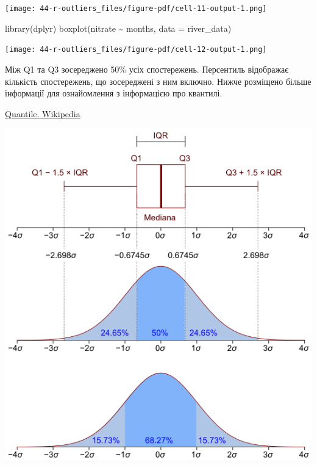 \documentclass[
  letterpaper,
  DIV=11,
  numbers=noendperiod]{scrreprt}
\newenvironment{Shaded}{\begin{snugshade}}{\end{snugshade}}
\newcommand{\AttributeTok}[1]{\textcolor[rgb]{0.40,0.45,0.13}{#1}}
\newcommand{\FunctionTok}[1]{\textcolor[rgb]{0.28,0.35,0.67}{#1}}
\newcommand{\NormalTok}[1]{\textcolor[rgb]{0.00,0.23,0.31}{#1}}
\newcommand{\SpecialCharTok}[1]{\textcolor[rgb]{0.37,0.37,0.37}{#1}}
\newcommand{\StringTok}[1]{\textcolor[rgb]{0.13,0.47,0.30}{#1}}
\begin{document}
\begin{Shaded}
\end{Shaded}

\texttt{[image: 44-r-outliers\_files/figure-pdf/cell-11-output-1.png]}

\begin{Shaded}
\begin{Highlighting}[]
\FunctionTok{library}\NormalTok{(dplyr)}
\FunctionTok{boxplot}\NormalTok{(nitrate }\SpecialCharTok{\textasciitilde{}}\NormalTok{ months, }\AttributeTok{data =}\NormalTok{ river\_data)}
\end{Highlighting}
\end{Shaded}

\texttt{[image: 44-r-outliers\_files/figure-pdf/cell-12-output-1.png]}

Між Q1 та Q3 зосереджено 50\% усіх спостережень. Персентиль відображає
кількість спостережень, що зосереджені з ним включно. Нижче розміщено
більше інформації для ознайомлення з інформацією про квантилі.

\href{https://en.wikipedia.org/wiki/Quantile}{Quantile. Wikipedia}

\includegraphics{img/da-data-cleaning/quantiles.png}
\end{document}
